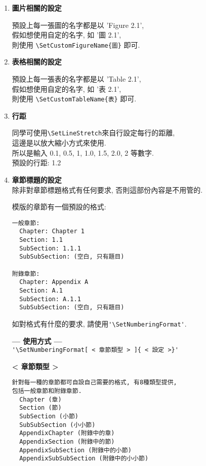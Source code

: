 \begin{enumerate}
  \item
  {
    \textbf{圖片相關的設定}

    預設上每一張圖的名字都是以 'Figure 2.1',\\
    假如想使用自定的名字, 如 '圖 2.1',\\
    則使用 \verb|\SetCustomFigureName{圖}| 即可.
  } %

  \item
  {
    \textbf{表格相關的設定}

    預設上每一張表的名字都是以 'Table 2.1',\\
    假如想使用自定的名字, 如 '表 2.1',\\
    則使用 \verb|\SetCustomTableName{表}| 即可.
  } %

  \item
  {
    \textbf{行距}

    同學可使用\verb|\SetLineStretch|來自行設定每行的距離,\\
    這邊是以放大縮小方式來使用.\\
    所以是輸入 0.1, 0.5, 1, 1.0, 1.5, 2.0, 2 等數字.\\
    預設的行距: 1.2
  } %

  \newpage
  \item
  {
    \textbf{章節標題的設定}\\
    除非對章節標題格式有任何要求, 否則這部份內容是不用管的.

    模版的章節有一個預設的格式:
    \begin{DescriptionFrame}
    \begin{verbatim}
一般章節:
  Chapter: Chapter 1
  Section: 1.1
  SubSection: 1.1.1
  SubSubSection: (空白, 只有題目)

附錄章節:
  Chapter: Appendix A
  Section: A.1
  SubSection: A.1.1
  SubSubSection: (空白, 只有題目)
    \end{verbatim}
    \end{DescriptionFrame}

    如對格式有什麼的要求, 請使用\verb|'\SetNumberingFormat'|.

    \textbf{--- 使用方式 ---}\\
    \verb|'\SetNumberingFormat[ < 章節類型 > ]{ < 設定 >}'|

    \textbf{< 章節類型 >}
    \begin{DescriptionFrame}
    \begin{verbatim}
針對每一種的章節都可自設自己需要的格式, 有8種類型提供,
包括一般章節和附錄章節.
  Chapter (章)
  Section (節)
  SubSection (小節)
  SubSubSection (小小節)
  AppendixChapter (附錄中的章)
  AppendixSection (附錄中的節)
  AppendixSubSection (附錄中的小節)
  AppendixSubSubSection (附錄中的小小節)
    \end{verbatim}
    \end{DescriptionFrame}

}
\end{enumerate}
